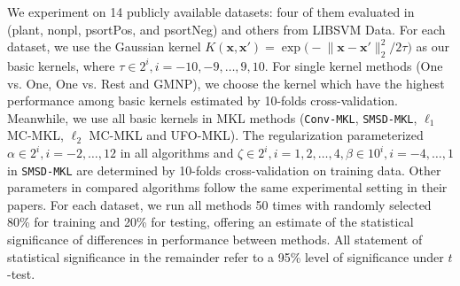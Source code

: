\documentclass{article}
\begin{document}
We experiment on 14 publicly available datasets:
four of them evaluated in \cite{ZienO2007} (plant, nonpl, psortPos, and psortNeg)
and others from LIBSVM Data. %
For each dataset, we use the Gaussian kernel
$K(\mathbf{x}, \mathbf{x}')=\exp\big(-{\|\mathbf{x}-\mathbf{x}'\|_2^2}/{2\tau}\big)$ as our basic kernels,
where $\tau \in {2^i, i=-10,-9,\ldots,9,10}$.
For single kernel methods (One vs. One, One vs. Rest and GMNP),
we choose the kernel which have the highest performance among basic kernels estimated by 10-folds cross-validation.
Meanwhile, we use all basic kernels in MKL methods (\texttt{Conv-MKL}, \texttt{SMSD-MKL}, $\ell_1$ MC-MKL, $\ell_2$ MC-MKL and UFO-MKL).
The regularization parameterized $\alpha \in {2^i, i=-2, \ldots, 12}$ in all algorithms and
$\zeta\in{2^i,i=1,2,\ldots,4}, \beta \in {10^i, i=-4, \ldots, 1}$ in \texttt{SMSD-MKL} are determined by 10-folds cross-validation on training data.
Other parameters in compared algorithms follow the same experimental setting in their papers.
For each dataset, we run all methods 50 times with randomly selected 80\% for training and 20\% for testing,
offering an estimate of the statistical significance of differences
in performance between methods.
All statement of statistical significance in the remainder refer to a 95\% level of significance under $t$-test.
\end{document}
